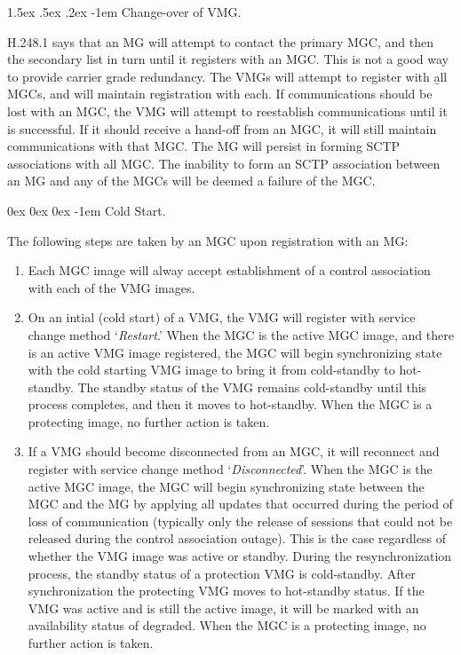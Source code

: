 \documentclass[letterpaper,final,notitlepage,twocolumn,10pt,twoside]{article}
\makeatletter
\let\normalsize = \small
\let\small = \footnotesize
\let\footnotesize = \scriptsize
\let\scriptsize = \tiny
\renewcommand\paragraph{\@startsection{paragraph}{4}{\z@}%
                                    {1.5ex \@plus .5ex \@minus .2ex}%
                                    {-1em}%
                                    {\normalfont\normalsize\bfseries\slshape}}
\renewcommand\subparagraph{\@startsection{subparagraph}{5}{\parindent}%
                                       {0ex \@plus 0ex \@minus 0ex}%
                                       {-1em}%
                                      {\normalfont\normalsize\bfseries\slshape}}
\makeatother
\begin{document}
\paragraph{Change-over of VMG.}

H.248.1\cite[]{H2481} says that an MG will attempt to contact the primary MGC,
and then the secondary list in turn until it registers with an MGC.  This is
not a good way to provide carrier grade redundancy.  The VMGs will attempt to
register with {\b all} MGCs, and will maintain registration with each.  If
communications should be lost with an MGC, the VMG will attempt to reestablish
communications until it is successful.  If it should receive a hand-off from
an MGC, it will still maintain communications with that MGC.  The MG will
persist in forming SCTP associations with all MGC.  The inability to form an
SCTP association between an MG and any of the MGCs will be deemed a failure of
the MGC.

\subparagraph{Cold Start.}

The following steps are taken by an MGC upon registration with an MG:

\begin{enumerate}

\item Each MGC image will alway accept establishment of a control association
with each of the VMG images.

\item On an intial (cold start) of a VMG, the  VMG will register with service
change method `{\it Restart}.'  When the MGC is the active MGC image, and there
is an active VMG image registered, the MGC will begin synchronizing state with
the cold starting VMG image to bring it from cold-standby to hot-standby.  The
standby status of the VMG remains cold-standby until this process completes,
and then it moves to hot-standby.  When the MGC is a protecting image, no
further action is taken.

\item If a VMG should become disconnected from an MGC, it will reconnect and
register with service change method `{\it Disconnected}'.  When the MGC is the
active MGC image, the MGC will begin synchronizing state between the MGC and
the MG by applying all updates that occurred during the period of loss of
communication (typically only the release of sessions that could not be
released during the control association outage).  This is the case regardless
of whether the VMG image was active or standby.  During the resynchronization
process, the standby status of a protection VMG is cold-standby.  After
synchronization the protecting VMG moves to hot-standby status.  If the VMG
was active and is still the active image, it will be marked with an
availability status of degraded.  When the MGC is a protecting image, no
further action is taken.

\end{enumerate}
\end{document}
